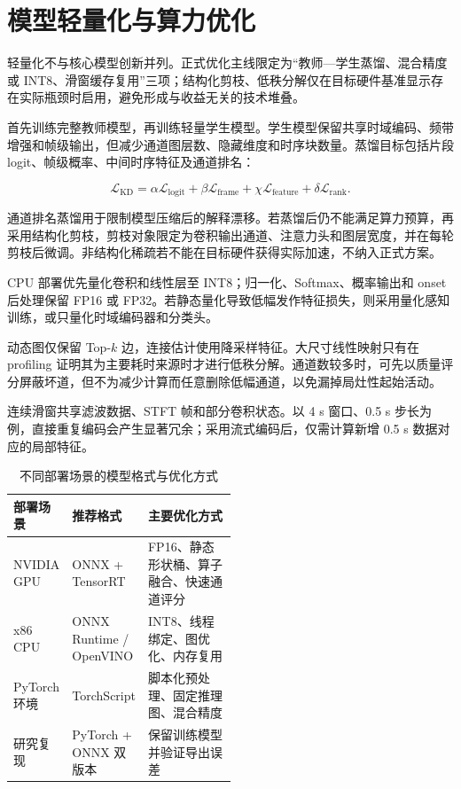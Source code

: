 \clearpage
\section{模型轻量化与算力优化}

轻量化不与核心模型创新并列。正式优化主线限定为“教师—学生蒸馏、混合精度或 INT8、滑窗缓存复用”三项；结构化剪枝、低秩分解仅在目标硬件基准显示存在实际瓶颈时启用，避免形成与收益无关的技术堆叠。

首先训练完整教师模型，再训练轻量学生模型。学生模型保留共享时域编码、频带增强和帧级输出，但减少通道图层数、隐藏维度和时序块数量。蒸馏目标包括片段 logit、帧级概率、中间时序特征及通道排名：

$$
\mathcal{L}_{\mathrm{KD}}=
\alpha\mathcal{L}_{\mathrm{logit}}
+\beta\mathcal{L}_{\mathrm{frame}}
+\chi\mathcal{L}_{\mathrm{feature}}
+\delta\mathcal{L}_{\mathrm{rank}}.
$$

通道排名蒸馏用于限制模型压缩后的解释漂移。若蒸馏后仍不能满足算力预算，再采用结构化剪枝，剪枝对象限定为卷积输出通道、注意力头和图层宽度，并在每轮剪枝后微调。非结构化稀疏若不能在目标硬件获得实际加速，不纳入正式方案。

CPU 部署优先量化卷积和线性层至 INT8；归一化、Softmax、概率输出和 onset 后处理保留 FP16 或 FP32。若静态量化导致低幅发作特征损失，则采用量化感知训练，或只量化时域编码器和分类头。

动态图仅保留 Top-$k$ 边，连接估计使用降采样特征。大尺寸线性映射只有在 profiling 证明其为主要耗时来源时才进行低秩分解。通道数较多时，可先以质量评分屏蔽坏道，但不为减少计算而任意删除低幅通道，以免漏掉局灶性起始活动。

连续滑窗共享滤波数据、STFT 帧和部分卷积状态。以 4 s 窗口、0.5 s 步长为例，直接重复编码会产生显著冗余；采用流式编码后，仅需计算新增 0.5 s 数据对应的局部特征。

\begin{table}[htbp]
    \centering
    \small
    \caption{不同部署场景的模型格式与优化方式}
    \label{tab:deployment}
    \renewcommand{\arraystretch}{1.25}
    \setlength{\tabcolsep}{3pt}
    \begin{tabularx}{\linewidth}{@{}p{0.22\linewidth}p{0.28\linewidth}X@{}}
        \toprule
        \textbf{部署场景} & \textbf{推荐格式} & \textbf{主要优化方式} \\
        \midrule
        NVIDIA GPU & ONNX + TensorRT & FP16、静态形状桶、算子融合、快速通道评分 \\
        x86 CPU & ONNX Runtime / OpenVINO & INT8、线程绑定、图优化、内存复用 \\
        PyTorch 环境 & TorchScript & 脚本化预处理、固定推理图、混合精度 \\
        研究复现 & PyTorch + ONNX 双版本 & 保留训练模型并验证导出误差 \\
        \bottomrule
    \end{tabularx}
\end{table}

